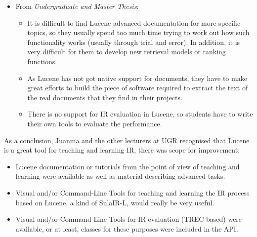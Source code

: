\begin{itemize}
\item From {\it Undergraduate and Master Thesis}:

	\begin{itemize}
		\item It is difficult to find Lucene advanced documentation for more specific topics, so they usually spend too much time trying to work out how such functionality works (usually through trial and error). In addition,  it is very difficult for them to develop new retrieval models or ranking functions.
		\item As Lucene has not got native support for documents, they have to make great efforts to build the piece of software required to extract the text of the real documents that they find in their projects.
		\item There is no support for IR evaluation in Lucene, so students have to write their own tools to evaluate the performance.
	\end{itemize}

\end{itemize}

As a conclusion, Juanma and the other lecturers at UGR recognised that Lucene is a great tool for teaching and learning IR, there was scope for improvement:

\begin{itemize}
\item Lucene documentation or tutorials from the point of view of teaching and learning were available as well as material describing advanced tasks.
\item Visual and/or Command-Line Tools for teaching and learning the IR process based on Lucene, a kind of SulaIR-L, would really be very useful.
\item Visual and/or Command-Line Tools for IR evaluation (TREC-based) were available, or at least, classes for these purposes were included in the API.
\end{itemize}